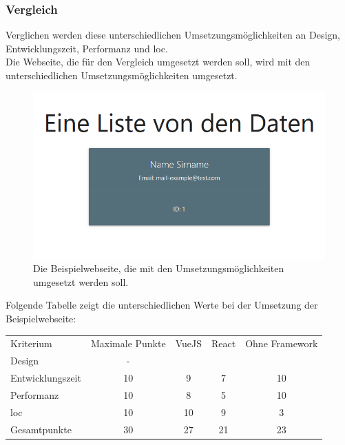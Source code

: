 \subsubsection{Vergleich}
Verglichen werden diese unterschiedlichen Umsetzungsmöglichkeiten an Design, Entwicklungszeit, Performanz und \Gls{loc}.\\
Die Webseite, die für den Vergleich umgesetzt werden soll, wird mit den unterschiedlichen Umsetzungsmöglichkeiten umgesetzt.\\
\begin{figure}[H]
	\centering
	\includegraphics[width=0.8\linewidth]{images/example_page}
	\caption[Die Beispielwebseite]{Die Beispielwebseite, die mit den Umsetzungsmöglichkeiten umgesetzt werden soll.}
	\label{fig:example}
\end{figure}
Folgende Tabelle zeigt die unterschiedlichen Werte bei der Umsetzung der Beispielwebseite:
\begin{table}
	\label{tab:vergleich}
	\centering
	\label{center}
	\begin{tabular}{lcccc}
		Kriterium        & \multicolumn{1}{l}{Maximale Punkte} & \multicolumn{1}{l}{VueJS} & \multicolumn{1}{l}{React} & \multicolumn{1}{l}{Ohne Framework}  \\
		Design           & -                        &            \checkmark               &             \checkmark              &          \checkmark                           \\
		Entwicklungszeit & 10                         &             9              &               7            &               10                      \\
		Performanz       & 10                         &             8              &               5            &                 10                    \\
		\Gls{loc}              & 10                         &             10              &               9            &                   3                  \\
		Gesamtpunkte     & 30                         &              27             &               21            &                23                    
	\end{tabular}
\end{table}
